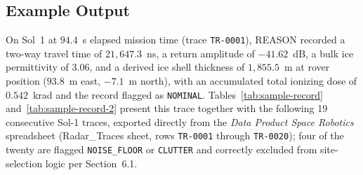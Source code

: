 \documentclass[11pt]{article}
\begin{document}
\subsection{Example Output}

On Sol~1 at $94.4$~s elapsed mission time (trace \texttt{TR-0001}), REASON recorded a two-way
travel time of $21{,}647.3$~ns, a return amplitude of $-41.62$~dB, a bulk ice permittivity of
$3.06$, and a derived ice shell thickness of $1{,}855.5$~m at rover position ($93.8$~m east,
$-7.1$~m north), with an accumulated total ionizing dose of $0.542$~krad and the record flagged
as \texttt{NOMINAL}. Tables~\ref{tab:sample-record} and~\ref{tab:sample-record-2} present this
trace together with the following 19 consecutive Sol-1 traces, exported directly from the
\textit{Data Product Space Robotics} spreadsheet (Radar\_Traces sheet, rows \texttt{TR-0001}
through \texttt{TR-0020}); four of the twenty are flagged \texttt{NOISE\_FLOOR} or
\texttt{CLUTTER} and correctly excluded from site-selection logic per Section~6.1.
\end{document}
